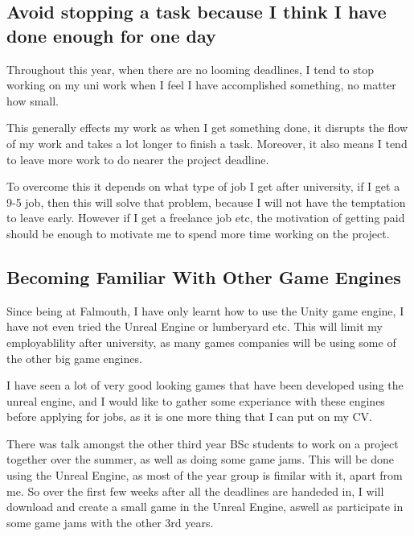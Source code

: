 \documentclass{scrartcl}
\begin{document}
\subsection{Avoid stopping a task because I think I have done enough for one day}

Throughout this year, when there are no looming deadlines, I tend to stop working on my uni work when I feel I have accomplished something, no matter how small.

This generally effects my work as when I get something done, it disrupts the flow of my work and takes a lot longer to finish a task. Moreover, it also means I tend to leave more work to do nearer the project deadline.

To overcome this it depends on what type of job I get after university, if I get a 9-5 job, then this will solve that problem, because I will not have the temptation to leave early. However if I get a freelance job etc, the motivation of getting paid should be enough to motivate me to spend more time working on the project.
\par



\subsection{Becoming Familiar With Other Game Engines}
Since being at Falmouth, I have only learnt how to use the Unity game engine, I have not even tried the Unreal Engine or lumberyard etc. This will limit my employablility after university, as many games companies will be using some of the other big game engines.

I have seen a lot of very good looking games that have been developed using the unreal engine, and I would like to gather some experiance with these engines before applying for jobs, as it is one more thing that I can put on my CV.

There was talk amongst the other third year BSc students to work on a project together over the summer, as well as doing some game jams. This will be done using the Unreal Engine, as most of the year group is fimilar with it, apart from me. So over the first few weeks after all the deadlines are handeded in, I will download and create a small game in the Unreal Engine, aswell as participate in some game jams with the other 3rd years.
\par
\end{document}
